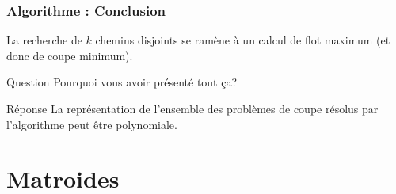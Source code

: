 \documentclass[9pt]{beamer}
\begin{document}
\begin{frame}
    \frametitle{Algorithme : Conclusion}
    \begin{rmq}
        La recherche de $k$ chemins disjoints se ramène à un calcul de flot maximum (et donc de
        coupe minimum).
    \end{rmq}

    \vfill
    \pause

    \begin{alertblock}{Question}
        Pourquoi vous avoir présenté tout ça?
    \end{alertblock}

    \vfill
    \pause

    \begin{exampleblock}{Réponse}
        La représentation de l'ensemble des problèmes de coupe résolus par l'algorithme peut être
        polynomiale.
    \end{exampleblock}
\end{frame}

\section{Matroides}
\end{document}
